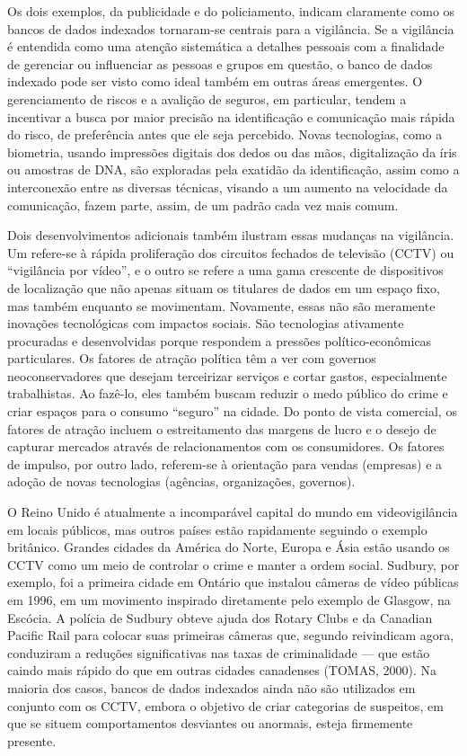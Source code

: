 Os dois exemplos, da publicidade e do policiamento, indicam claramente
como os bancos de dados indexados tornaram-se centrais para a
vigilância. Se a vigilância é entendida como uma atenção sistemática a
detalhes pessoais com a finalidade de gerenciar ou influenciar as
pessoas e grupos em questão, o banco de dados indexado pode ser visto
como ideal também em outras áreas emergentes. O gerenciamento de riscos
e a avalição de seguros, em particular, tendem a incentivar a busca por
maior precisão na identificação e comunicação mais rápida do risco, de
preferência antes que ele seja percebido. Novas tecnologias, como a
biometria, usando impressões digitais dos dedos ou das mãos,
digitalização da íris ou amostras de DNA, são exploradas pela exatidão
da identificação, assim como a interconexão entre as diversas técnicas,
visando a um aumento na velocidade da comunicação, fazem parte, assim,
de um padrão cada vez mais comum.

Dois desenvolvimentos adicionais também ilustram essas mudanças na
vigilância. Um refere-se à rápida proliferação dos circuitos fechados de
televisão (CCTV) ou ``vigilância por vídeo'', e o outro se refere a uma
gama crescente de dispositivos de localização que não apenas situam os
titulares de dados em um espaço fixo, mas também enquanto se movimentam.
Novamente, essas não são meramente inovações tecnológicas com impactos
sociais. São tecnologias ativamente procuradas e desenvolvidas porque
respondem a pressões político-econômicas particulares. Os fatores de
atração política têm a ver com governos neoconservadores que desejam
terceirizar serviços e cortar gastos, especialmente trabalhistas. Ao
fazê-lo, eles também buscam reduzir o medo público do crime e criar
espaços para o consumo ``seguro'' na cidade. Do ponto de vista
comercial, os fatores de atração incluem o estreitamento das margens de
lucro e o desejo de capturar mercados através de relacionamentos com os
consumidores. Os fatores de impulso, por outro lado, referem-se à
orientação para vendas (empresas) e a adoção de novas tecnologias
(agências, organizações, governos).

O Reino Unido é atualmente a incomparável capital do mundo em
videovigilância em locais públicos, mas outros países estão rapidamente
seguindo o exemplo britânico. Grandes cidades da América do Norte,
Europa e Ásia estão usando os CCTV como um meio de controlar o crime e
manter a ordem social. Sudbury, por exemplo, foi a primeira cidade em
Ontário que instalou câmeras de vídeo públicas em 1996, em um movimento
inspirado diretamente pelo exemplo de Glasgow, na Escócia. A polícia de
Sudbury obteve ajuda dos Rotary Clubs e da Canadian Pacific Rail para
colocar suas primeiras câmeras que, segundo reivindicam agora,
conduziram a reduções significativas nas taxas de criminalidade --- que
estão caindo mais rápido do que em outras cidades canadenses (TOMAS,
2000). Na maioria dos casos, bancos de dados indexados ainda não são
utilizados em conjunto com os CCTV, embora o objetivo de criar
categorias de suspeitos, em que se situem comportamentos desviantes ou
anormais, esteja firmemente presente.

